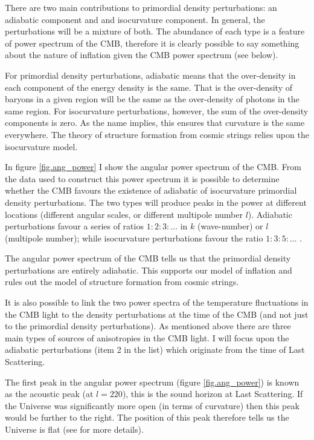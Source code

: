 There are two main contributions to primordial density perturbations: an adiabatic component and and isocurvature component. In general, the perturbations will be a mixture of both. The abundance of each type is a feature of power spectrum of the CMB, therefore it is clearly possible to say something about the nature of inflation given the CMB power spectrum (see below).

For primordial density perturbations, adiabatic means that the over-density in each component of the energy density is the same. That is the over-density of baryons in a given region will be the same as the over-density of photons in the same region. For isocurvature perturbations, however, the sum of the over-density components is zero. As the name implies, this ensures that curvature is the same everywhere. The theory of structure formation from cosmic strings relies upon the isocurvature model.

In figure \ref{fig.ang_power} I show the angular power spectrum of the CMB. From the data used to construct this power spectrum it is possible to determine whether the CMB favours the existence of adiabatic of isocurvature primordial density perturbations. The two types will produce peaks in the power at different locations (different angular scales, or different multipole number $l$). Adiabatic perturbations favour a series of ratios $1:2:3: \ldots$ in $k$ (wave-number) or $l$ (multipole number); while isocurvature perturbations favour the ratio $1:3:5: \ldots$ \citep{bib_huw2}.

The angular power spectrum of the CMB tells us that the primordial density perturbations are entirely adiabatic. This supports our model of inflation and rules out the model of structure formation from cosmic strings.

It is also possible to link the two power spectra of the temperature fluctuations in the CMB light to the density perturbations at the time of the CMB (and not just to the primordial density perturbations). As mentioned above there are three main types of sources of anisotropies in the CMB light. I will focus upon the adiabatic perturbations (item 2 in the list) which originate from the time of Last Scattering.

The first peak in the angular power spectrum (figure \ref{fig.ang_power}) is known as the acoustic peak (at $l = 220$), this is the sound horizon at Last Scattering. If the Universe was significantly more open (in terms of curvature) then this peak would be further to the right. The position of this peak therefore tells us the Universe is flat (see \citet{bib_pea} for more details).

